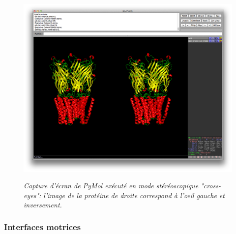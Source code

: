 \begin{figure}
  \centering
  {\includegraphics[width=.75\linewidth]{./figures/ch2/pymol_stereo}}
    \caption{{\it Capture d'écran de PyMol exécuté en mode stéréoscopique "cross-eyes": l'image de la protéine de droite correspond à l'oeil gauche et inversement.}}
  \label{Fig:pymol_stereo}
  \hspace{0.3cm}
\end{figure}

\subsubsection{Interfaces motrices} \label{interface_motor}

